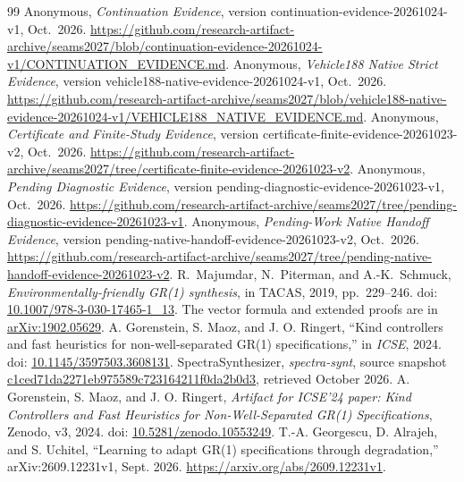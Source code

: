 \documentclass[11pt]{article}
\begin{document}
\begin{thebibliography}{99}
Anonymous, \emph{Continuation Evidence}, version continuation-evidence-20261024-v1, Oct.~2026. \url{https://github.com/research-artifact-archive/seams2027/blob/continuation-evidence-20261024-v1/CONTINUATION_EVIDENCE.md}.
Anonymous, \emph{Vehicle188 Native Strict Evidence}, version vehicle188-native-evidence-20261024-v1, Oct.~2026. \url{https://github.com/research-artifact-archive/seams2027/blob/vehicle188-native-evidence-20261024-v1/VEHICLE188_NATIVE_EVIDENCE.md}.
Anonymous, \emph{Certificate and Finite-Study Evidence}, version certificate-finite-evidence-20261023-v2, Oct.~2026. \url{https://github.com/research-artifact-archive/seams2027/tree/certificate-finite-evidence-20261023-v2}.
Anonymous, \emph{Pending Diagnostic Evidence}, version pending-diagnostic-evidence-20261023-v1, Oct.~2026. \url{https://github.com/research-artifact-archive/seams2027/tree/pending-diagnostic-evidence-20261023-v1}.
Anonymous, \emph{Pending-Work Native Handoff Evidence}, version pending-native-handoff-evidence-20261023-v2, Oct.~2026. \url{https://github.com/research-artifact-archive/seams2027/tree/pending-native-handoff-evidence-20261023-v2}.
 R.~Majumdar, N.~Piterman, and A.-K.~Schmuck, \emph{Environmentally-friendly GR(1) synthesis}, in TACAS, 2019, pp.~229--246. doi: \href{https://doi.org/10.1007/978-3-030-17465-1_13}{10.1007/978-3-030-17465-1\_13}. The vector formula and extended proofs are in \href{https://arxiv.org/abs/1902.05629}{arXiv:1902.05629}.
 A. Gorenstein, S. Maoz, and J. O. Ringert, ``Kind controllers and fast heuristics for non-well-separated GR(1) specifications,'' in \emph{ICSE}, 2024. doi: \href{https://doi.org/10.1145/3597503.3608131}{10.1145/3597503.3608131}.
 SpectraSynthesizer, \emph{spectra-synt}, source snapshot \href{https://github.com/SpectraSynthesizer/spectra-synt/tree/c1ced71da2271eb975589c723164211f0da2b0d3}{c1ced71da2271eb975589c723164211f0da2b0d3}, retrieved October 2026.
 A. Gorenstein, S. Maoz, and J. O. Ringert, \emph{Artifact for ICSE'24 paper: Kind Controllers and Fast Heuristics for Non-Well-Separated GR(1) Specifications}, Zenodo, v3, 2024. doi: \href{https://doi.org/10.5281/zenodo.10553249}{10.5281/zenodo.10553249}.
 T.-A. Georgescu, D. Alrajeh, and S. Uchitel, ``Learning to adapt GR(1) specifications through degradation,'' arXiv:2609.12231v1, Sept. 2026. \url{https://arxiv.org/abs/2609.12231v1}.

\end{thebibliography}
\end{document}
